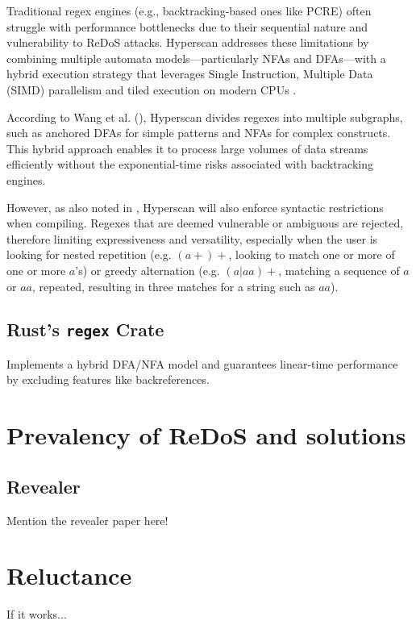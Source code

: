 Traditional regex engines (e.g., backtracking-based ones like PCRE) often struggle with performance bottlenecks due to their sequential nature and vulnerability to ReDoS attacks. Hyperscan addresses these limitations by combining multiple automata models—particularly NFAs and DFAs—with a hybrid execution strategy that leverages Single Instruction, Multiple Data (SIMD) parallelism and tiled execution on modern CPUs .

According to Wang et al. (\cite{hyperscan}), Hyperscan divides regexes into multiple subgraphs, such as anchored DFAs for simple patterns and NFAs for complex constructs. This hybrid approach enables it to process large volumes of data streams efficiently without the exponential-time risks associated with backtracking engines.

However, as also noted in \cite{hyperscan}, Hyperscan will also enforce syntactic restrictions when compiling. Regexes that are deemed vulnerable or ambiguous are rejected, therefore limiting expressiveness and versatility, especially when the user is looking for nested repetition (e.g. $(a+)+$, looking to match one or more of one or more $a$'s) or greedy alternation (e.g. $(a|aa)+$, matching a sequence of $a$ or $aa$, repeated, resulting in three matches for a string such as $aa$).

\subsection{Rust's \texttt{regex} Crate}
Implements a hybrid DFA/NFA model and guarantees linear-time performance by excluding features like backreferences.

\section{Prevalency of ReDoS and solutions}
\subsection{Revealer}
Mention the revealer paper here!

\section{Reluctance}
If it works...